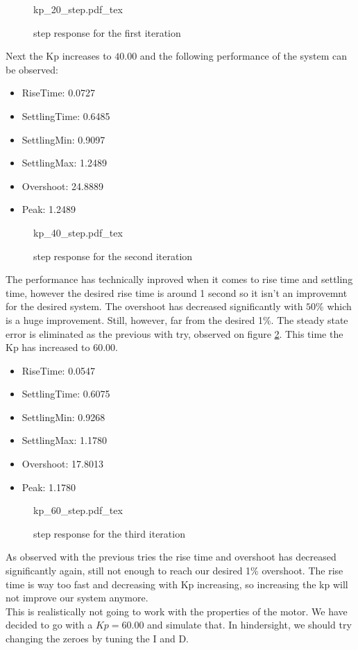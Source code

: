 \documentclass[12pt]{article}
\begin{document}
\begin{figure}[H]
  \centering
  \def\svgwidth{0.5\textwidth}
  {kp_20_step.pdf_tex}
  \caption{step response for the first iteration} \label{my_first_step}
\end{figure}
Next the Kp increases to $40.00$ and the following performance of the system can be observed:
\begin{itemize}
  \item RiseTime: 0.0727
  \item SettlingTime: 0.6485
  \item SettlingMin: 0.9097
  \item SettlingMax: 1.2489
  \item Overshoot: 24.8889
  \item Peak: 1.2489
\end{itemize}
\begin{figure}[H]
  \centering
  \def\svgwidth{0.5\textwidth}
  {kp_40_step.pdf_tex}
  \caption{step response for the second iteration} \label{my_second_step}
\end{figure}
The performance has technically inproved when it comes to rise time and settling time, however the desired rise time is around 1 second so it isn't an improvemnt for the desired system. The overshoot has decreased significantly with $50\%$ which is a huge improvement. Still, however, far from the desired 1\%. The steady state error is eliminated as the previous with try, observed on figure \ref{my_second_step}. This time the Kp has increased to $60.00$.
\begin{itemize}
  \item RiseTime: 0.0547
  \item SettlingTime: 0.6075
  \item SettlingMin: 0.9268
  \item SettlingMax:  1.1780
  \item Overshoot: 17.8013
  \item Peak: 1.1780
\end{itemize}
\begin{figure}[H]
  \centering
  \def\svgwidth{0.5\textwidth}
  {kp_60_step.pdf_tex}
  \caption{step response for the third iteration} \label{my_third_step}  
\end{figure}
As observed with the previous tries the rise time and overshoot has decreased significantly again, still not enough to reach our desired 1\% overshoot. The rise time is way too fast and decreasing with Kp increasing, so increasing the kp will not improve our system anymore. \\
This is realistically not going to work with the properties of the motor. We have decided to go with a $Kp = 60.00$ and simulate that. In hindersight, we should try changing the zeroes by tuning the I and D.
\end{document}

